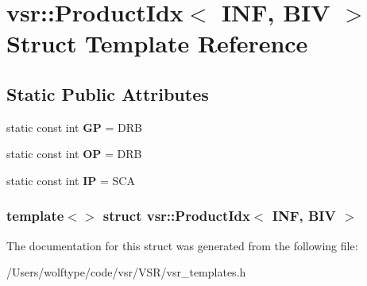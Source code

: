 \hypertarget{structvsr_1_1_product_idx_3_01_i_n_f_00_01_b_i_v_01_4}{\section{vsr\-:\-:Product\-Idx$<$ I\-N\-F, B\-I\-V $>$ Struct Template Reference}
\label{structvsr_1_1_product_idx_3_01_i_n_f_00_01_b_i_v_01_4}
}
\subsection*{Static Public Attributes}
\begin{DoxyCompactItemize}
\item 
\hypertarget{structvsr_1_1_product_idx_3_01_i_n_f_00_01_b_i_v_01_4_a5f4f4932fccfb799ca029a0aec525073}{static const int {\bfseries G\-P} = D\-R\-B}\label{structvsr_1_1_product_idx_3_01_i_n_f_00_01_b_i_v_01_4_a5f4f4932fccfb799ca029a0aec525073}

\item 
\hypertarget{structvsr_1_1_product_idx_3_01_i_n_f_00_01_b_i_v_01_4_a78038b737721c90885b43e4bf3f5561c}{static const int {\bfseries O\-P} = D\-R\-B}\label{structvsr_1_1_product_idx_3_01_i_n_f_00_01_b_i_v_01_4_a78038b737721c90885b43e4bf3f5561c}

\item 
\hypertarget{structvsr_1_1_product_idx_3_01_i_n_f_00_01_b_i_v_01_4_ada0c10746ea96321c9eba66d95c1162e}{static const int {\bfseries I\-P} = S\-C\-A}\label{structvsr_1_1_product_idx_3_01_i_n_f_00_01_b_i_v_01_4_ada0c10746ea96321c9eba66d95c1162e}

\end{DoxyCompactItemize}
\subsubsection*{template$<$$>$ struct vsr\-::\-Product\-Idx$<$ I\-N\-F, B\-I\-V $>$}



The documentation for this struct was generated from the following file\-:\begin{DoxyCompactItemize}
\item 
/\-Users/wolftype/code/vsr/\-V\-S\-R/vsr\-\_\-templates.\-h\end{DoxyCompactItemize}
